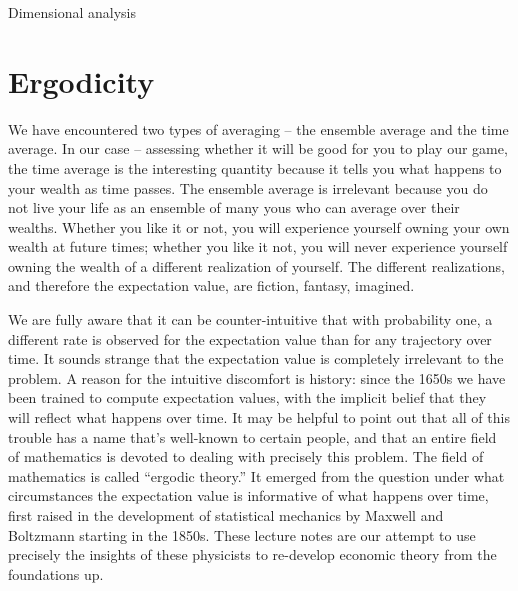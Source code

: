 \begin{excursion}{Dimensional analysis}
%
\end{excursion}

\section{Ergodicity}
We have encountered two types of averaging -- the ensemble average and the time average. In our case -- assessing whether it will be good for you to play our  game, the time average is the interesting quantity because it tells you what happens to your wealth as time passes. The ensemble average is irrelevant because you do not live your life as an ensemble of many yous who can average over their wealths. Whether you like it or not, you will experience yourself owning your own wealth at future times; whether you like it not, you will never experience yourself owning the wealth of a different realization of yourself. The different realizations, and therefore the expectation value, are fiction, fantasy, imagined.

We are fully aware that it can be counter-intuitive that with probability one, a different rate is observed for the expectation value than for any trajectory over time. It sounds strange that the expectation value is completely irrelevant to the problem. A reason for the intuitive discomfort is history: since the 1650s we have been trained to compute expectation values, with the implicit belief that they will reflect what happens over time. It may be helpful to point out that all of this trouble has a name that's well-known to certain people, and that an entire field of mathematics is devoted to dealing with precisely this problem. The field of mathematics is called ``ergodic theory.'' It emerged from the question under what circumstances the expectation value is informative 
of what happens over time, first raised in the development of statistical mechanics by Maxwell and Boltzmann starting in the 1850s. These lecture notes are our attempt to use precisely the insights of these physicists to re-develop economic theory from the foundations up.

